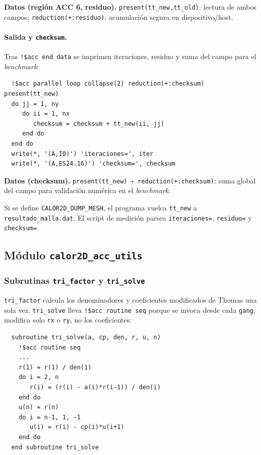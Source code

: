 \documentclass[11pt,a4paper]{article}
\begin{document}
\noindent\textbf{Datos (regi\'on ACC 6, residuo).}
\texttt{present(tt\_new,tt\_old)}: lectura de ambos campos;
\texttt{reduction(+:residuo)}: acumulaci\'on segura en dispositivo/host.

\paragraph{Salida y \texttt{checksum}.}
Tras \texttt{!\$acc end data} se imprimen iteraciones, residuo y suma del campo
para el \emph{benchmark}:

\begin{verbatim}
  !$acc parallel loop collapse(2) reduction(+:checksum) present(tt_new)
  do jj = 1, ny
     do ii = 1, nx
        checksum = checksum + tt_new(ii, jj)
     end do
  end do
  write(*, '(A,I0)') 'iteraciones=', iter
  write(*, '(A,ES24.16)') 'checksum=', checksum
\end{verbatim}

\noindent\textbf{Datos (checksum).} \texttt{present(tt\_new)} + \texttt{reduction(+:checksum)}:
suma global del campo para validaci\'on num\'erica en el \emph{benchmark}.

Si se define \texttt{CALOR2D\_DUMP\_MESH}, el programa vuelca \texttt{tt\_new} a
\texttt{resultado\_malla.dat}. El script de medici\'on parsea \texttt{iteraciones=},
\texttt{residuo=} y \texttt{checksum=}.

\subsection{M\'odulo \texttt{calor2D\_acc\_utils}}

\subsubsection{Subrutinas \texttt{tri\_factor} y \texttt{tri\_solve}}

\texttt{tri\_factor} calcula los denominadores y coeficientes modificados de
Thomas una sola vez. \texttt{tri\_solve} lleva \texttt{!\$acc routine seq} porque
se invoca desde cada \texttt{gang}; modifica solo \texttt{rx} o \texttt{ry}, no
los coeficientes:

\begin{verbatim}
  subroutine tri_solve(a, cp, den, r, u, n)
    !$acc routine seq
    ...
    r(1) = r(1) / den(1)
    do i = 2, n
       r(i) = (r(i) - a(i)*r(i-1)) / den(i)
    end do
    u(n) = r(n)
    do i = n-1, 1, -1
       u(i) = r(i) - cp(i)*u(i+1)
    end do
  end subroutine tri_solve
\end{verbatim}
\end{document}
